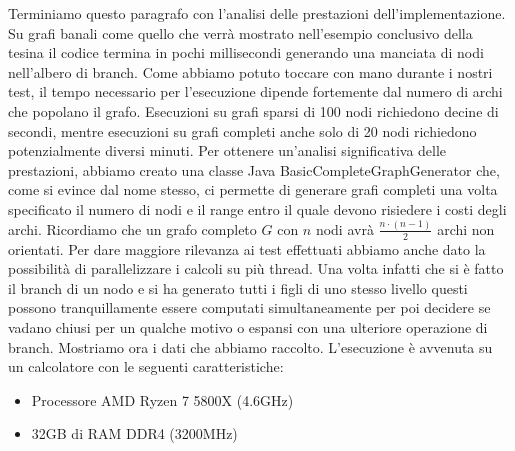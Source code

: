\documentclass[
    article,            %
    12pt,                %
    oneside,            %
    a4paper,            %
    english,            %
    italian,                %
    sumario=tradicional,
]{abntex2}
\begin{document}
    \newline
    Terminiamo questo paragrafo con l'analisi delle prestazioni dell'implementazione.
    Su grafi banali come quello che verrà mostrato nell'esempio conclusivo della tesina il codice termina in pochi millisecondi generando una manciata di nodi nell'albero di branch.\newline
    Come abbiamo potuto toccare con mano durante i nostri test, il tempo necessario per l'esecuzione dipende fortemente dal numero di archi che popolano il grafo.
    Esecuzioni su grafi sparsi di 100 nodi richiedono decine di secondi, mentre esecuzioni su grafi completi anche solo di 20 nodi richiedono potenzialmente diversi minuti.
    Per ottenere un'analisi significativa delle prestazioni, abbiamo creato una classe Java {\selectfont BasicCompleteGraphGenerator} che, come si evince dal nome stesso, ci permette di generare grafi completi una volta specificato il numero di nodi e il range entro il quale devono risiedere i costi degli archi.
    Ricordiamo che un grafo completo $G$ con $n$ nodi avrà $\frac{n\cdot (n-1)}{2}$ archi non orientati.\newline
    Per dare maggiore rilevanza ai test effettuati abbiamo anche dato la possibilità di parallelizzare i calcoli su più thread.
    Una volta infatti che si è fatto il branch di un nodo e si ha generato tutti i figli di uno stesso livello questi possono tranquillamente essere computati simultaneamente per poi decidere se vadano chiusi per un qualche motivo o espansi con una ulteriore operazione di branch.
    \newline
    Mostriamo ora i dati che abbiamo raccolto.
    L'esecuzione è avvenuta su un calcolatore con le seguenti caratteristiche:
    \begin{itemize}
        \item Processore AMD Ryzen 7 5800X (4.6GHz)
        \item 32GB di RAM DDR4 (3200MHz)
    \end{itemize}
\end{document}
